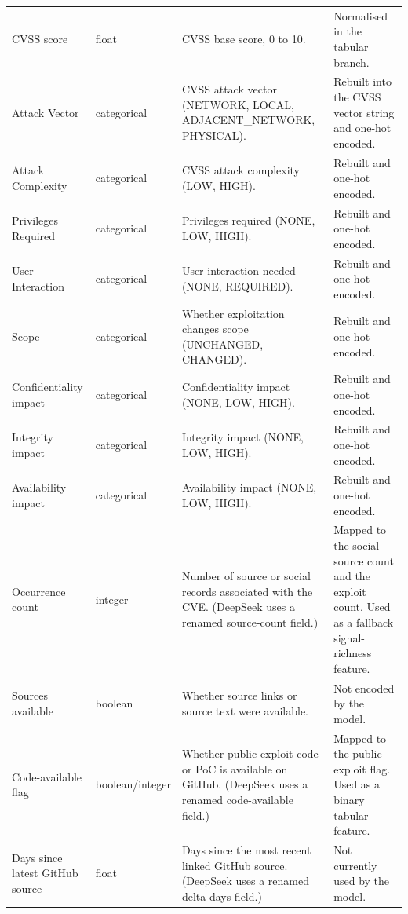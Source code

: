 \documentclass[11pt]{article}
\begin{document}
\begin{longtable}{p{}p{}p{}p{}}
CVSS score & float & CVSS base score, 0 to 10. & Normalised in the tabular branch. \\

Attack Vector & categorical & CVSS attack vector (NETWORK, LOCAL, ADJACENT\_NETWORK, PHYSICAL). & Rebuilt into the CVSS vector string and one-hot encoded. \\

Attack Complexity & categorical & CVSS attack complexity (LOW, HIGH). & Rebuilt and one-hot encoded. \\

Privileges Required & categorical & Privileges required (NONE, LOW, HIGH). & Rebuilt and one-hot encoded. \\

User Interaction & categorical & User interaction needed (NONE, REQUIRED). & Rebuilt and one-hot encoded. \\

Scope & categorical & Whether exploitation changes scope (UNCHANGED, CHANGED). & Rebuilt and one-hot encoded. \\

Confidentiality impact & categorical & Confidentiality impact (NONE, LOW, HIGH). & Rebuilt and one-hot encoded. \\

Integrity impact & categorical & Integrity impact (NONE, LOW, HIGH). & Rebuilt and one-hot encoded. \\

Availability impact & categorical & Availability impact (NONE, LOW, HIGH). & Rebuilt and one-hot encoded. \\

Occurrence count & integer & Number of source or social records associated with the CVE. (DeepSeek uses a renamed source-count field.) & Mapped to the social-source count and the exploit count. Used as a fallback signal-richness feature. \\

Sources available & boolean & Whether source links or source text were available. & Not encoded by the model. \\

Code-available flag & boolean/integer & Whether public exploit code or PoC is available on GitHub. (DeepSeek uses a renamed code-available field.) & Mapped to the public-exploit flag. Used as a binary tabular feature. \\

Days since latest GitHub source & float & Days since the most recent linked GitHub source. (DeepSeek uses a renamed delta-days field.) & Not currently used by the model. \\


\end{longtable}
\end{document}
